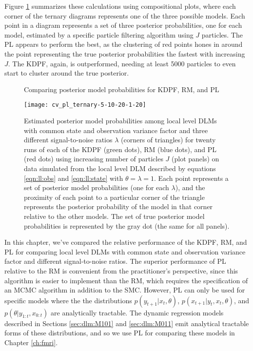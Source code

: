 Figure \ref{fig:comp:post} summarizes these calculations using compositional plots, where each corner of the ternary diagrams represents one of the three possible models. Each point in a diagram represents a set of three posterior probabilities, one for each model, estimated by a specific particle filtering algorithm using $J$ particles. The PL appears to perform the best, as the clustering of red points hones in around the point representing the true posterior probabilities the fastest with increasing $J$. The KDPF, again, is outperformed, needing at least 5000 particles to even start to cluster around the true posterior.

\begin{figure}[ht]
\ssp
\centering
\caption{Comparing posterior model probabilities for KDPF, RM, and PL} \label{fig:comp:post}
\texttt{[image: cv\_pl\_ternary-5-10-20-1-20]}
\caption*{Estimated posterior model probabilities among local level DLMs with common state and observation variance factor and three different signal-to-noise ratios $\lambda$ (corners of triangles) for twenty runs of each of the KDPF (green dots), RM (blue dots), and PL (red dots) using increasing number of particles $J$ (plot panels) on data simulated from the local level DLM described by equations \eqref{eqn:ll:obs} and \eqref{eqn:ll:state} with $\theta = \lambda = 1$. Each point represents a set of posterior model probabilities (one for each $\lambda$), and the proximity of each point to a particular corner of the triangle represents the posterior probability of the model in that corner relative to the other models. The set of true posterior model probabilities is represented by the gray dot (the same for all panels).}
\end{figure}

In this chapter, we've compared the relative performance of the KDPF, RM, and PL for comparing local level DLMs with common state and observation variance factor and different signal-to-noise ratios. The superior performance of PL relative to the RM is convenient from the practitioner's perspective, since this algorithm is easier to implement than the RM, which requires the specification of an MCMC algorithm in addition to the SMC. However, PL can only be used for specific models where the the distributions $p(y_{t+1}|x_t,\theta)$, $p(x_{t+1}|y_t,x_t,\theta)$, and $p(\theta|y_{1:t},x_{0:t})$ are analytically tractable. The dynamic regression models described in Sections \ref{sec:dlm:M101} and \ref{sec:dlm:M011} emit analytical tractable forms of these distributions, and so we use PL for comparing these models in Chapter \ref{ch:fmri}. 